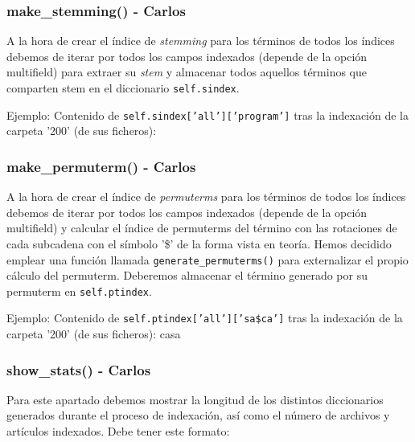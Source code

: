 \documentclass[12pt,a4paper]{article}
\begin{document}
\subsubsection{make\_stemming() - Carlos}
A la hora de crear el índice de \textit{stemming} para los términos de todos los índices debemos de iterar por todos los campos indexados (depende de la opción multifield) para extraer su \textit{stem} y almacenar todos aquellos términos que comparten stem en el diccionario \texttt{self.sindex}.

Ejemplo: Contenido de \texttt{self.sindex['all']['program']} tras la indexación de la carpeta '200' (de sus ficheros):

\subsubsection{make\_permuterm() - Carlos}
A la hora de crear el índice de \textit{permuterms} para los términos de todos los índices debemos de iterar por todos los campos indexados (depende de la opción multifield) y calcular el índice de permuterms del término con las rotaciones de cada subcadena con el símbolo '\$' de la forma vista en teoría. Hemos decidido emplear una función llamada \texttt{generate\_permuterms()} para externalizar el propio cálculo del permuterm. Deberemos almacenar el término generado por su permuterm en \texttt{self.ptindex}.

Ejemplo: Contenido de \texttt{self.ptindex['all']['sa\$ca']} tras la indexación de la carpeta '200' (de sus ficheros):
\newline
casa

\subsubsection{show\_stats() - Carlos}
Para este apartado debemos mostrar la longitud de los distintos diccionarios generados durante el proceso de indexación, así como el número de archivos y artículos indexados. Debe tener este formato:
\end{document}
